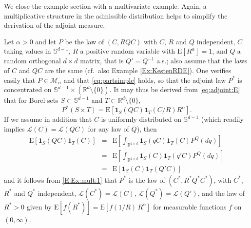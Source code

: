 \documentclass{aptpubarxiv}
\numberwithin{equation}{section}
\begin{document}
We close the example section with a multivariate example. Again, a multiplicative structure in the admissible distribution helps to simplify the derivation of the adjoint measure.
\fi

\begin{ex}
\label{Ex:mult:1}
Let $\alpha > 0$ and let $P$ be the law of $(C, R Q C)$ with $C$, $R$ and $Q$ independent, $C$ taking values in $\mathbb{S}^{d-1}$, $R$ a positive random variable with ${\mathrm{E}}[R^\alpha] = 1$, and $Q$ a random orthogonal $d \times d$ matrix, that is $Q' = Q^{-1}$ a.s.; also assume that the laws of $C$ and $QC$ are the same (cf.\ also Example \ref{Ex:KestenRDE}). One verifies easily that $P \in \mathcal{M}_\alpha$ and that \eqref{eq:partsimple} holds, so that the adjoint law $P^*$ is concentrated on $\mathbb{S}^{d-1} \times (\mathbb{R}^d \setminus \{ 0 \})$. It may thus be derived from \eqref{eq:adjoint:E} that for Borel sets $S \subset \mathbb{S}^{d-1}$ and $T \subset \mathbb{R}^d \setminus \{ 0 \}$,
\begin{equation}
\label{E:Ex:mult:1}
  P^*(S \times T)={\mathrm{E}}[{\boldsymbol{1}}_S(QC){\boldsymbol{1}}_{T}(C/R)R^\alpha].
\end{equation}
If we assume in addition that $C$ is uniformly distributed on $\mathbb{S}^{d-1}$ (which readily implies $\mathcal{L}(C)=\mathcal{L}(QC)$ for any law of $Q$), then
\begin{eqnarray*}
{\mathrm{E}}[{\boldsymbol{1}}_S(QC){\boldsymbol{1}}_{T}(C)]&=&{\mathrm{E}}\left[\int_{\mathbb{R}^{d \times d}} {\boldsymbol{1}}_S(qC){\boldsymbol{1}}_{T}(C)P^Q(dq)\right] \\
&=& {\mathrm{E}}\left[\int_{\mathbb{R}^{d \times d}} {\boldsymbol{1}}_S(C){\boldsymbol{1}}_{T}(q'C)P^Q(dq)\right] \\
&=& {\mathrm{E}}[{\boldsymbol{1}}_S(C){\boldsymbol{1}}_{T}(Q'C)]
\end{eqnarray*}
and it follows from \eqref{E:Ex:mult:1} that $P^*$ is the law of $(C^*, R^* Q^* C^*)$, with $C^*$, $R^*$ and $Q^*$ independent, ${\mathcal{L}}(C^*) = {\mathcal{L}}(C)$, ${\mathcal{L}}(Q^*) = {\mathcal{L}}(Q')$, and the law of $R^* > 0$ given by ${\mathrm{E}}[f(R^*)] = {\mathrm{E}}[f(1/R) \, R^\alpha]$ for measurable functions $f$ on $(0, \infty)$.
\end{ex}
\end{document}
